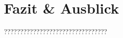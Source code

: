\documentclass{whswinvcbook}
\begin{document}
\chapter{Fazit \& Ausblick}
????????????????????????????????

\nocite{*}
\backmatter

\preparebibliography

\end{document}

